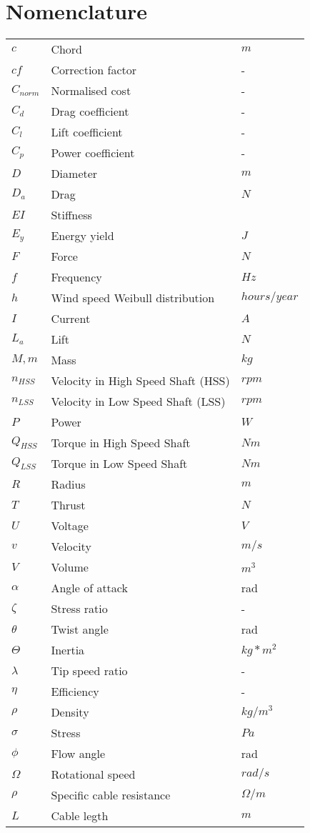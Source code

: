 \section*{Nomenclature}



\vspace{10 mm}
\begin{tabular}{p{3cm} p{7cm} p{4cm}}

$c$ & Chord & $m$ \\
$cf$ & Correction factor & - \\
$C_{norm}$ & Normalised cost & - \\
$C_d$ & Drag coefficient & - \\
$C_l$ & Lift coefficient & - \\
$C_p$ & Power coefficient & - \\
$D$ & Diameter & $m$ \\
$D_a$ & Drag & $N$ \\
$EI$ & Stiffness & \\
$E_y$ & Energy yield & $J$ \\
$F$ & Force & $N$ \\
$f$ & Frequency & $Hz$ \\
$h$ & Wind speed Weibull distribution & $hours/year$ \\ 
$I$ & Current & $A$ \\
$L_a$ & Lift & $N$ \\
$M, m$ & Mass & $kg$ \\
$n_{HSS}$ & Velocity in High Speed Shaft (HSS) & $rpm$ \\
$n_{LSS}$ & Velocity in Low Speed Shaft (LSS)& $rpm$ \\
$P$  & Power  & $W$  \\
$Q_{HSS}$ & Torque in High Speed Shaft & $Nm$ \\
$Q_{LSS}$ & Torque in Low Speed Shaft & $Nm$ \\
$R$ & Radius & $m$ \\ 
$T$ & Thrust & $N$ \\
$U$ & Voltage & $V$ \\
$v$ & Velocity & $m/s$ \\
$V$ & Volume & $m^3$ \\

$\alpha$ & Angle of attack & rad \\
$\zeta$ & Stress ratio & - \\
$\theta$ & Twist angle & rad \\
$\Theta$ & Inertia & $kg*m^2$ \\
$\lambda$ & Tip speed ratio & - \\
$\eta$ & Efficiency & - \\
$\rho$ & Density & $kg/m^3$ \\
$\sigma$ & Stress & $Pa$ \\
$\phi$ & Flow angle & rad \\
$\Omega$ & Rotational speed & $rad/s$ \\
$\rho$ & Specific cable resistance & $\Omega /m$\\
$L$ & Cable legth & $m$\\


\end{tabular}
